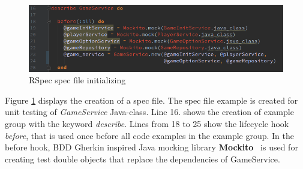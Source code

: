     \begin{figure}[ht]
      \begin{center}
        \includegraphics[width=13.7cm]{images/rspec-init.png}
        \caption{RSpec spec file initializing}
        \label{fig:rspec-init}
      \end{center}
    \end{figure}
    Figure \ref{fig:rspec-init} displays the creation of a spec file. The spec file example is created for unit testing
    of \textit{GameService} Java-class. Line 16. shows the creation of example group with the keyword \textit{describe}. Lines from
    18 to 25 show the lifecycle hook \textit{before}, that is used once before all code examples in the example group.
    In the before hook, BDD Gherkin inspired Java mocking library \textbf{Mockito}~\cite{mockito} is used for
    creating test double objects that replace the dependencies of GameService.

